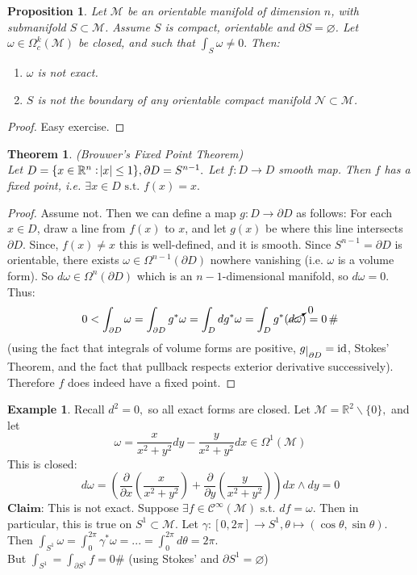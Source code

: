 \documentclass[10pt]{article}
\theoremstyle{plain}
\newtheorem{theorem}{Theorem}[section]
\newtheorem{prop}[thm]{Proposition}
\theoremstyle{definition}
\newtheorem{exmp}[thm]{Example} %
\newcommand{\st}{\text{ s.t. }}
\newcommand{\Claim}{\textbf{Claim: }}
\newcommand{\id}{\text{id}}
\newcommand{\Real}{\mathbb{R}}
\newcommand{\man}{\mathcal{M}}
\newcommand{\nan}{\mathcal{N}}
\newcommand{\pformman}[1]{\Omega^{#1}(\man)}
\newcommand{\compactpformman}[1]{\Omega^{#1}_c(\man)}
\newcommand{\dx}{dx}
\newcommand{\dy}{dy}
\newcommand{\deriv}{d}
\newcommand{\df}{df}
\newcommand{\dw}{d\omega}
\newcommand{\cts}[1]{\mathcal{C}^{\infty}(#1)}
\def\restrict#1{\raise-.5ex\hbox{\ensuremath|}_{#1}}
\begin{document}
\begin{prop}
Let $\man$ be an orientable manifold of dimension $n$, with submanifold $S\subset \man$. Assume $S$ is compact, orientable and $\partial S = \varnothing$. Let $\omega \in \compactpformman{k}$ be closed, and such that $\int_S \omega \neq 0.$ Then:
\begin{enumerate}
    \item $\omega$ is not exact.
    \item $S$ is not the boundary of any orientable compact manifold $\nan \subset \man$.
\end{enumerate}
\end{prop}\noindent
\begin{proof}
Easy exercise.
\end{proof}
\begin{theorem}
(Brouwer's Fixed Point Theorem) \\
Let $D = \{x\in\Real^n : \abs{x} \leq 1\},\partial D = S^{n-1}.$ Let $f : D \to D $ smooth map. Then $f$ has a fixed point,  i.e. $\exists x \in D \st f(x) = x.$
\end{theorem}
\begin{proof}
Assume not. Then we can define a map $g : D \to \partial D$ as follows: For each $x\in D$, draw a line from $f(x)$ to $x$, and let $g(x)$ be where this line intersects $\partial D$. Since, $f(x) \neq x$ this is well-defined, and it is smooth. Since $S^{n-1} = \partial D$ is orientable, there exists $\omega \in \Omega^{n-1}({\partial D})$ nowhere vanishing (i.e. $\omega$ is a volume form). So $\dw \in \Omega^n (\partial D)$ which is an $n-1$-dimensional manifold, so $\dw = 0.$ Thus:
$$0 < \int_{\partial D} \omega = \int_{\partial D} g^* \omega = \int _D \deriv g^* \omega = \int_D g^*(\cancelto{0}{\dw}) = 0 \,\#$$
(using the fact that integrals of volume forms are positive, $g \restrict{\partial D} = \id$, Stokes' Theorem, and the fact that pullback respects exterior derivative successively). Therefore $f$ does indeed have a fixed point.
\end{proof}
\begin{exmp}
Recall $\deriv ^2 = 0,$ so all exact forms are closed. Let $\man = \Real^2 \backslash \{0\}, $ and let 
$$\omega = \frac{x}{x^2+y^2} \dy - \frac{y}{x^2+y^2} \dx \in \pformman{1}$$
This is closed:
$$\dw = \left(\frac{\partial}{\partial x} \left(\frac{x}{x^2+y^2}\right) + \frac{\partial}{\partial y}\left( \frac{y}{x^2+y^2}\right)\right) \dx \wedge \dy = 0$$
$\Claim$This is not exact. Suppose $\exists f \in \cts{\man} \st \df = \omega. $ Then in particular, this is true on $S^1 \subset \man.$
Let $\gamma : [0,2\pi] \to S^1, \theta \mapsto (\cos\theta,\sin\theta).$ Then $\int_{S^1} \omega = \int_0^{2\pi} \gamma^* \omega = ... = \int_0 ^{2\pi} \deriv \theta = 2\pi.$\\
But $\int_{S^1} = \int_{\partial S^1} f = 0 \#$ (using Stokes' and $\partial S^1 = \varnothing$)
\end{exmp}
\end{document}
